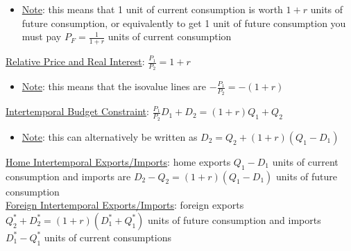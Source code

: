 \documentclass{article}
\begin{document}
\begin{itemize}
  \item  \underline{Note}: this means that 1 unit of current consumption is worth $1 + r$ units of future consumption, or equivalently to get 1 unit of future consumption you must pay $P_{F} = \tfrac{1}{1+r}$ units of current consumption
\end{itemize}
\underline{Relative Price and Real Interest}: $\tfrac{P_{1}}{P_{2}} = 1 + r$
\begin{itemize}
  \item  \underline{Note}: this means that the isovalue lines are $-\tfrac{P_{1}}{P_{2}} = -(1+r)$
\end{itemize}
\underline{Intertemporal Budget Constraint}: $\frac{P_{1}}{P_{2}}D_{1} + D_{2} = (1+r)Q_{1} + Q_{2}$
\begin{itemize}
  \item  \underline{Note}: this can alternatively be written as $D_{2} = Q_{2} + (1+r)(Q_{1} - D_{1})$
\end{itemize}
\underline{Home Intertemporal Exports/Imports}: home exports $Q_{1} - D_{1}$ units of current consumption and imports are $D_{2} - Q_{2} = (1+r)(Q_{1} - D_{1})$ units of future consumption \\
\underline{Foreign Intertemporal Exports/Imports}: foreign exports $Q_{2}^{*}+D_{2}^{*} = (1+r)(D_{1}^{*} + Q_{1}^{*})$ units of future consumption and imports $D_{1}^{*}  - Q_{1}^{*}$ units of current consumptions
\end{document}
